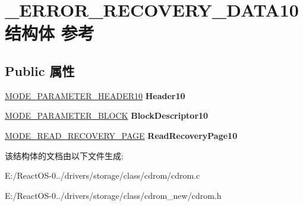 \hypertarget{struct___e_r_r_o_r___r_e_c_o_v_e_r_y___d_a_t_a10}{}\section{\+\_\+\+E\+R\+R\+O\+R\+\_\+\+R\+E\+C\+O\+V\+E\+R\+Y\+\_\+\+D\+A\+T\+A10结构体 参考}
\label{struct___e_r_r_o_r___r_e_c_o_v_e_r_y___d_a_t_a10}
\subsection*{Public 属性}
\begin{DoxyCompactItemize}
\item 
\mbox{\label{struct___e_r_r_o_r___r_e_c_o_v_e_r_y___d_a_t_a10_a526d39da0304b8176d08e651bf67fc42}} 
\hyperlink{struct___m_o_d_e___p_a_r_a_m_e_t_e_r___h_e_a_d_e_r10}{M\+O\+D\+E\+\_\+\+P\+A\+R\+A\+M\+E\+T\+E\+R\+\_\+\+H\+E\+A\+D\+E\+R10} {\bfseries Header10}
\item 
\mbox{\label{struct___e_r_r_o_r___r_e_c_o_v_e_r_y___d_a_t_a10_a52806b325673c37d7bbbc65aa9257b50}} 
\hyperlink{struct___m_o_d_e___p_a_r_a_m_e_t_e_r___b_l_o_c_k}{M\+O\+D\+E\+\_\+\+P\+A\+R\+A\+M\+E\+T\+E\+R\+\_\+\+B\+L\+O\+CK} {\bfseries Block\+Descriptor10}
\item 
\mbox{\label{struct___e_r_r_o_r___r_e_c_o_v_e_r_y___d_a_t_a10_acbaa52a563c750adbac2b3a5dc28a1b3}} 
\hyperlink{struct___m_o_d_e___r_e_a_d___r_e_c_o_v_e_r_y___p_a_g_e}{M\+O\+D\+E\+\_\+\+R\+E\+A\+D\+\_\+\+R\+E\+C\+O\+V\+E\+R\+Y\+\_\+\+P\+A\+GE} {\bfseries Read\+Recovery\+Page10}
\end{DoxyCompactItemize}


该结构体的文档由以下文件生成\+:\begin{DoxyCompactItemize}
\item 
E\+:/\+React\+O\+S-\/0../drivers/storage/class/cdrom/cdrom.\+c\item 
E\+:/\+React\+O\+S-\/0../drivers/storage/class/cdrom\+\_\+new/cdrom.\+h\end{DoxyCompactItemize}
